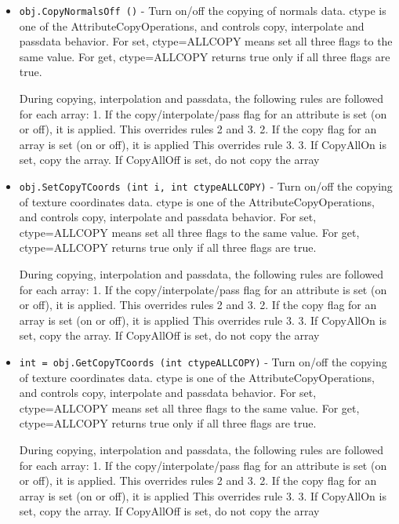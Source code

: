 \begin{itemize}
\item  \verb|obj.CopyNormalsOff ()| -  Turn on/off the copying of normals data.
 ctype is one of the AttributeCopyOperations, and controls copy, 
 interpolate and passdata behavior.
 For set, ctype=ALLCOPY means set all three flags to the same value.
 For get, ctype=ALLCOPY returns true only if all three flags are true.

 During copying, interpolation and passdata, the following rules are 
 followed for each array:
 1. If the copy/interpolate/pass flag for an attribute is set (on or off), it is applied.
    This overrides rules 2 and 3.
 2. If the copy flag for an array is set (on or off), it is applied
    This overrides rule 3.
 3. If CopyAllOn is set, copy the array.
    If CopyAllOff is set, do not copy the array

\item  \verb|obj.SetCopyTCoords (int i, int ctypeALLCOPY)| -  Turn on/off the copying of texture coordinates data.
 ctype is one of the AttributeCopyOperations, and controls copy, 
 interpolate and passdata behavior.
 For set, ctype=ALLCOPY means set all three flags to the same value.
 For get, ctype=ALLCOPY returns true only if all three flags are true.

 During copying, interpolation and passdata, the following rules are 
 followed for each array:
 1. If the copy/interpolate/pass flag for an attribute is set (on or off), it is applied.
    This overrides rules 2 and 3.
 2. If the copy flag for an array is set (on or off), it is applied
    This overrides rule 3.
 3. If CopyAllOn is set, copy the array.
    If CopyAllOff is set, do not copy the array

\item  \verb|int = obj.GetCopyTCoords (int ctypeALLCOPY)| -  Turn on/off the copying of texture coordinates data.
 ctype is one of the AttributeCopyOperations, and controls copy, 
 interpolate and passdata behavior.
 For set, ctype=ALLCOPY means set all three flags to the same value.
 For get, ctype=ALLCOPY returns true only if all three flags are true.

 During copying, interpolation and passdata, the following rules are 
 followed for each array:
 1. If the copy/interpolate/pass flag for an attribute is set (on or off), it is applied.
    This overrides rules 2 and 3.
 2. If the copy flag for an array is set (on or off), it is applied
    This overrides rule 3.
 3. If CopyAllOn is set, copy the array.
    If CopyAllOff is set, do not copy the array


\end{itemize}
